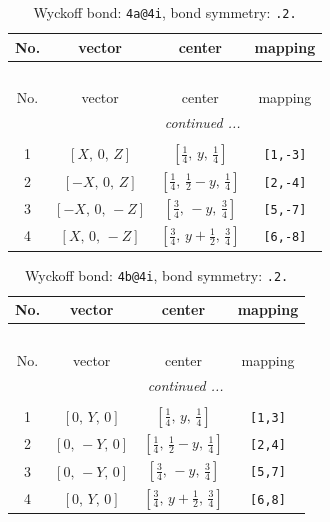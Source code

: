 \documentclass[fleqn,8pt]{jsarticle}
\begin{document}
\begin{longtable}{cccc}
\caption{Wyckoff bond: {\tt 4a@4i}, bond symmetry: {\tt .2.}}
 \\
 \hline \hline
No. & vector & center & mapping \\ \hline \endfirsthead

\multicolumn{3}{l}{\tablename\ \thetable{}} \\
 \hline \hline
No. & vector & center & mapping \\ \hline \endhead

 \hline \hline
\multicolumn{3}{r}{\footnotesize\it continued ...} \\ \endfoot

 \hline \hline
\multicolumn{3}{r}{} \\ \endlastfoot

1 & $\left[ X,\, 0,\, Z \right]$ & $\left[ \frac{1}{4},\, y,\, \frac{1}{4} \right]$ & {\tt [1,-3]} \\ \hline
2 & $\left[ - X,\, 0,\, Z \right]$ & $\left[ \frac{1}{4},\, \frac{1}{2} - y,\, \frac{1}{4} \right]$ & {\tt [2,-4]} \\ \hline
3 & $\left[ - X,\, 0,\, - Z \right]$ & $\left[ \frac{3}{4},\, - y,\, \frac{3}{4} \right]$ & {\tt [5,-7]} \\ \hline
4 & $\left[ X,\, 0,\, - Z \right]$ & $\left[ \frac{3}{4},\, y + \frac{1}{2},\, \frac{3}{4} \right]$ & {\tt [6,-8]} \\
\end{longtable}
\renewcommand{\arraystretch}{1.2}
\begin{longtable}{cccc}
\caption{Wyckoff bond: {\tt 4b@4i}, bond symmetry: {\tt .2.}}
 \\
 \hline \hline
No. & vector & center & mapping \\ \hline \endfirsthead

\multicolumn{3}{l}{\tablename\ \thetable{}} \\
 \hline \hline
No. & vector & center & mapping \\ \hline \endhead

 \hline \hline
\multicolumn{3}{r}{\footnotesize\it continued ...} \\ \endfoot

 \hline \hline
\multicolumn{3}{r}{} \\ \endlastfoot

1 & $\left[ 0,\, Y,\, 0 \right]$ & $\left[ \frac{1}{4},\, y,\, \frac{1}{4} \right]$ & {\tt [1,3]} \\ \hline
2 & $\left[ 0,\, - Y,\, 0 \right]$ & $\left[ \frac{1}{4},\, \frac{1}{2} - y,\, \frac{1}{4} \right]$ & {\tt [2,4]} \\ \hline
3 & $\left[ 0,\, - Y,\, 0 \right]$ & $\left[ \frac{3}{4},\, - y,\, \frac{3}{4} \right]$ & {\tt [5,7]} \\ \hline
4 & $\left[ 0,\, Y,\, 0 \right]$ & $\left[ \frac{3}{4},\, y + \frac{1}{2},\, \frac{3}{4} \right]$ & {\tt [6,8]} \\
\end{longtable}
\end{document}
